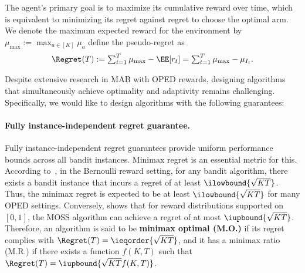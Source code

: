 The agent's primary goal is to maximize its cumulative reward over time, which is equivalent to minimizing its regret against regret to choose the optimal arm.
We denote the maximum expected reward for the environment by $\mu_{\max}:= \max_{a\in[K]} \mu_a$ define the pseudo-regret as
\begin{align*}
    \Regret(T):= \textstyle\sum_{t=1}^T \mu_{\max} - \EE[r_t] = \sum_{t=1}^T \mu_{\max} - \mu_{I_t}.
\end{align*}

Despite extensive research in MAB with OPED rewards, designing algorithms that simultaneously achieve optimality and adaptivity remains challenging.
Specifically, we would like to design algorithms with the following guarantees:

\paragraph{Fully instance-independent regret guarantee.} 
    Fully instance-independent regret guarantees provide uniform performance bounds across all bandit instances. 
    Minimax regret is an essential metric for this. 
    According to~\citet{auer03nonstochastic}, in the Bernoulli reward setting, for any bandit algorithm, there exists a bandit instance that incurs a regret of at least $\ilowbound{\sqrt{KT}}$.
    Thus, the minimax regret is expected to be at least $\ilowbound{\sqrt{KT}}$ for many OPED settings.
    Conversely, \citet{audibert09minimax} shows that for reward distributions supported on $[0,1]$, the MOSS algorithm can achieve a regret of at most $\iupbound{\sqrt{KT}}$.
    Therefore, an algorithm is said to be \textbf{minimax optimal (M.O.)} if its regret complies with $\Regret(T) = \ieqorder{\sqrt{KT}}$, and it has a minimax ratio (M.R.) if there exists a function $f(K, T)$ such that $\Regret(T) = \iupbound{\sqrt{KT}f(K, T)}$.
